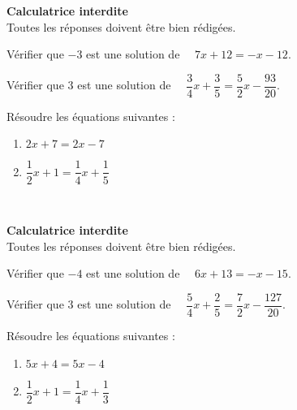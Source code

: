 \documentclass[a4paper,12pt,french]{article}
\begin{document}

\begin{center}
	\textbf{Calculatrice interdite}\\
	Toutes les réponses doivent être bien rédigées.\\
\end{center}

\exonote{}
Vérifier que $-3$ est une solution de $\quad 7x+12 = -x-12$.\\

	
Vérifier que $3$ est une solution de $\quad \dfrac{3}{4}x+\dfrac{3}{5}=\dfrac{5}{2}x-\dfrac{93}{20}$.\\


	
\exonote{}
Résoudre les équations suivantes :
\begin{multicols}{2}
	\begin{enumerate}[\bfseries 1.]
		\item	$2x+7 = 2x -7$	
		\item	$\dfrac{1}{2}x+1=\dfrac{1}{4}x+\dfrac{1}{5}$
	\end{enumerate}
\end{multicols}

\\

\eject
{}

\begin{center}
	\textbf{Calculatrice interdite}\\
	Toutes les réponses doivent être bien rédigées.\\
\end{center}

\setcounter{exoNum}{0}
\exonote{}
Vérifier que $-4$ est une solution de $\quad 6x+13 = -x-15$.\\


Vérifier que $3$ est une solution de $\quad \dfrac{5}{4}x+\dfrac{2}{5}=\dfrac{7}{2}x-\dfrac{127}{20}$.\\



\exonote{}
Résoudre les équations suivantes :
\begin{multicols}{2}
	\begin{enumerate}[\bfseries 1.]
		\item	$5x+4 = 5x -4$	
		\item	$\dfrac{1}{2}x+1=\dfrac{1}{4}x+\dfrac{1}{3}$
	\end{enumerate}
\end{multicols}

\\
\end{document}
